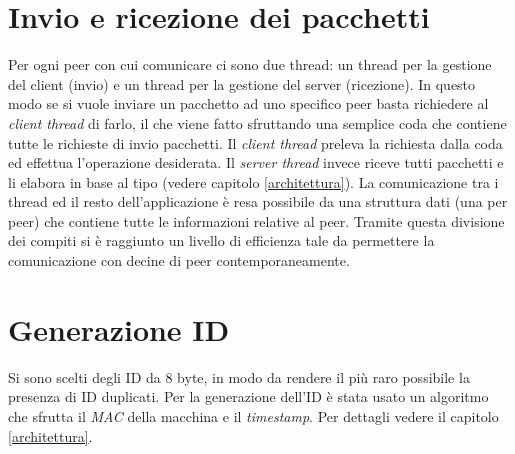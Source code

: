 \section{Invio e ricezione dei pacchetti}
Per ogni peer con cui comunicare ci sono due thread: un thread per la gestione del client (invio) e un thread per la gestione del server (ricezione).
In questo modo se si vuole inviare un pacchetto ad uno specifico peer basta richiedere al \textit{client thread} di farlo, il che viene fatto sfruttando una semplice coda che contiene tutte le richieste di invio pacchetti. Il \textit{client thread} preleva la richiesta dalla coda ed effettua l'operazione desiderata.
Il \textit{server thread} invece riceve tutti pacchetti e li elabora in base al tipo (vedere capitolo \ref{architettura}). La comunicazione tra i thread ed il resto dell'applicazione è resa possibile da una struttura dati (una per peer) che contiene tutte le informazioni relative al peer. Tramite questa divisione dei compiti si è raggiunto un livello di efficienza tale da permettere la comunicazione con decine di peer contemporaneamente.
\section{Generazione ID}
Si sono scelti degli ID da 8 byte, in modo da rendere il più raro possibile la presenza di ID duplicati. Per la generazione dell'ID è stata usato un algoritmo che sfrutta il \textit{MAC} della macchina e il \textit{timestamp}. Per dettagli vedere il capitolo \ref{architettura}.